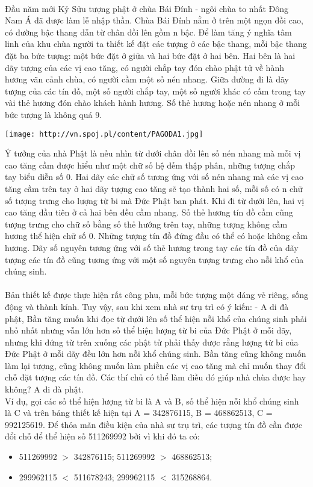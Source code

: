 

 

Đầu năm mới Kỷ Sửu tượng phật ở chùa Bái Đính - ngôi chùa to nhất Đông Nam Á đã được làm lễ nhập thần. Chùa Bái Đính nằm ở trên một ngọn đồi cao, có đường bậc thang dẫn từ chân đồi lên gồm n bậc. Để làm tăng ý nghĩa tâm linh của khu chùa người ta thiết kế đặt các tượng ở các bậc thang, mỗi bậc thang đặt ba bức tượng: một bức đặt ở giữa và hai bức đặt ở hai bên. Hai bên là hai dãy tượng của các vị cao tăng, có người chắp tay đón chào phật tử về hành hương vãn cảnh chùa, có người cầm một số nén nhang. Giữa đường đi là dãy tượng của các tín đồ, một số người chắp tay, một số người khác có cầm trong tay vài thẻ hương đón chào khách hành hương. Số thẻ hương hoặc nén nhang ở mỗi bức tượng là không quá 9.


\texttt{[image: http://vn.spoj.pl/content/PAGODA1.jpg]}

Ý tưởng của nhà Phật là nếu nhìn từ dưới chân đồi lên số nén nhang mà mỗi vị cao tăng cầm được hiểu như một chữ số hệ đếm thập phân, những tượng chắp tay biểu diễn số 0. Hai dãy các chữ số tương ứng với số nén nhang mà các vị cao tăng cầm trên tay ở hai dãy tượng cao tăng sẽ tạo thành hai số, mỗi số có n chữ số tượng trưng cho lượng từ bi mà Đức Phật ban phát. Khi đi từ dưới lên, hai vị cao tăng đầu tiên ở cả hai bên đều cầm nhang. Số thẻ hương tín đồ cầm cũng tượng trưng cho chữ số bằng số thẻ hướng trên tay, những tượng không cầm hương thể hiện chữ số 0. Những tượng tín đồ đứng đầu có thể có hoặc không cầm hương. Dãy số nguyên tương ứng với số thẻ hương trong tay các tín đồ của dãy tượng các tín đồ cũng tương ứng với một số nguyên tượng trưng cho nỗi khổ của chúng sinh.
\\
\\Bản thiết kế được thực hiện rất công phu, mỗi bức tượng một dáng vẻ riêng, sống động và thành kính. Tuy vậy, sau khi xem nhà sư trụ trì có ý kiến: - A di đà phật, Bần tăng muốn khi đọc từ dưới lên số thể hiện nỗi khổ của chúng sinh phải nhỏ nhất nhưng vẫn lớn hơn số thể hiện lượng từ bi của Đức Phật ở mỗi dãy, nhưng khi đứng từ trên xuống các phật tử phải thấy được rằng lượng từ bi của Đức Phật ở mỗi dãy đều lớn hơn nỗi khổ chúng sinh. Bần tăng cũng không muốn làm lại tượng, cũng không muốn làm phiền các vị cao tăng mà chỉ muốn thay đổi chỗ đặt tượng các tín đồ. Các thí chủ có thể làm điều đó giúp nhà chùa được hay không? A di đà phật.
\\Ví dụ, gọi các số thể hiện lượng từ bi là A và B, số thể hiện nỗi khổ chúng sinh là C và trên bảng thiết kế hiện tại A = 342876115, B = 468862513, C = 992125619. Để thỏa mãn điều kiện của nhà sư trụ trì, các tượng tín đồ cần được đổi chỗ để thể hiện số 511269992 bởi vì khi đó ta có:
\begin{itemize}
	\item 511269992 $>$ 342876115; 511269992 $>$ 468862513;
	\item 299962115 $<$ 511678243; 299962115 $<$ 315268864.
\end{itemize}

